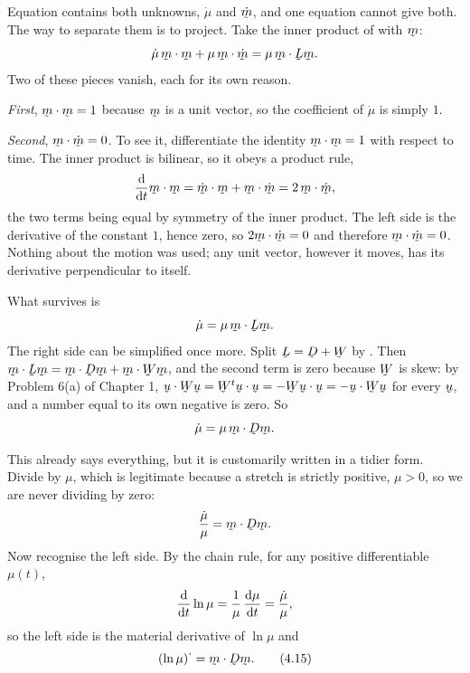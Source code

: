 Equation  contains both unknowns, $\dot\mu$ and $\dot\bm$, and
one equation cannot give both. The way to separate them is to project.
Take the inner product of  with $\bm$:
\[
   \dot\mu\,\ip\bm\bm+\mu\,\ip\bm{\dot\bm}=\mu\,\ip\bm{\bL\bm}.
\]
Two of these pieces vanish, each for its own reason.

\emph{First}, $\ip\bm\bm=1$ because $\bm$ is a unit vector, so the
coefficient of $\dot\mu$ is simply $1$.

\emph{Second}, $\ip\bm{\dot\bm}=0$. To see it, differentiate the identity
$\ip\bm\bm=1$ with respect to time. The inner product is bilinear, so it
obeys a product rule,
\[
   \frac{\dl}{\dl t}\ip\bm\bm
   =\ip{\dot\bm}\bm+\ip\bm{\dot\bm}
   =2\,\ip\bm{\dot\bm},
\]
the two terms being equal by symmetry of the inner product. The left side
is the derivative of the constant $1$, hence zero, so
$2\ip\bm{\dot\bm}=0$ and therefore $\ip\bm{\dot\bm}=0$. Nothing about the
motion was used; any unit vector, however it moves, has its derivative
perpendicular to itself.

What survives is
\[
   \dot\mu=\mu\,\ip\bm{\bL\bm}.
\]
The right side can be simplified once more. Split $\bL=\bD+\bW$ by
. Then $\ip\bm{\bL\bm}=\ip\bm{\bD\bm}+\ip\bm{\bW\bm}$, and the
second term is zero because $\bW$ is skew: by Problem 6(a) of Chapter 1,
$\ip\bu{\bW\bu}=\ip{\bW^{t}\bu}\bu=-\ip{\bW\bu}\bu=-\ip\bu{\bW\bu}$ for
every $\bu$, and a number equal to its own negative is zero. So
\[
   \dot\mu=\mu\,\ip\bm{\bD\bm}.
\]

This already says everything, but it is customarily written in a tidier
form. Divide by $\mu$, which is legitimate because a stretch is strictly
positive, $\mu>0$, so we are never dividing by zero:
\[
   \frac{\dot\mu}{\mu}=\ip\bm{\bD\bm}.
\]
Now recognise the left side. By the chain rule, for any positive
differentiable $\mu(t)$,
\[
   \frac{\mathrm{d}}{\mathrm{d} t}\ln\mu
   =\frac{1}{\mu}\,\frac{\mathrm{d}\mu}{\mathrm{d} t}
   =\frac{\dot\mu}{\mu},
\]
so the left side is the material derivative of $\ln\mu$ and
\begin{equation}
   (\ln\mu)^{\textstyle\cdot}=\ip{\bm}{\bD\bm}.
   \tag{4.15}\label{eq:4.15}
\end{equation}

